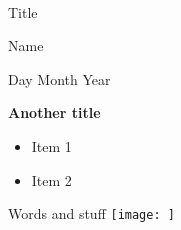 \documentclass[mathserif, 11pt, t]{beamer}
\renewcommand{\ftitle}[1]{\vspace{0.45cm}\textcolor{colorb}{
    {\textbf{#1}}}\vspace{0.15cm}\newline}
\begin{document}
\begin{center}
\ \\ [-0.5in]
\vfill
\bigskip
\bigskip
\bigskip
\bigskip
\bigskip

\begin{LARGE}
\begin{center}
Title
\end{center}
\end{LARGE}
\vfill

\begin{center}
Name
\end{center}
\vfill
Day Month Year
\bigskip
\bigskip
\bigskip
\vfill
\ \\ [-0.5in]
\end{center}

\begin{frame}
\ftitle{Another title}
\begin{itemize}[label={$\cdot$}]
\item Item 1
\item Item 2
\end{itemize}
\end{frame}

\begin{frame}
\ftitle{}
Words and stuff
\texttt{[image: ]}
\end{frame}
\end{document}
